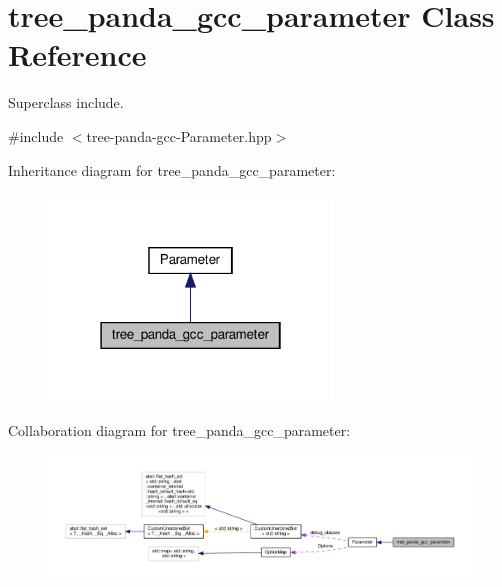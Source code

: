 \hypertarget{classtree__panda__gcc__parameter}{}\section{tree\+\_\+panda\+\_\+gcc\+\_\+parameter Class Reference}
\label{classtree__panda__gcc__parameter}


Superclass include.  




{\ttfamily \#include $<$tree-\/panda-\/gcc-\/\+Parameter.\+hpp$>$}



Inheritance diagram for tree\+\_\+panda\+\_\+gcc\+\_\+parameter\+:
\nopagebreak
\begin{figure}[H]
\begin{center}
\leavevmode
\includegraphics[width=214pt]{d4/d9a/classtree__panda__gcc__parameter__inherit__graph}
\end{center}
\end{figure}


Collaboration diagram for tree\+\_\+panda\+\_\+gcc\+\_\+parameter\+:
\nopagebreak
\begin{figure}[H]
\begin{center}
\leavevmode
\includegraphics[width=350pt]{d8/d02/classtree__panda__gcc__parameter__coll__graph}
\end{center}
\end{figure}
